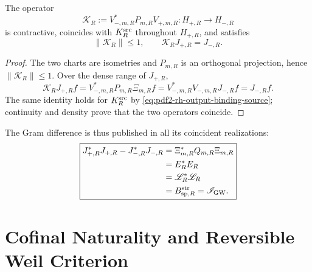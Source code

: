 \begin{proposition}
\label{prop:pdf2-rh-conector}
The operator
\begin{equation}\label{eq:pdf2-rh-k-r}
 \mathcal K_R
 :=V_{-,m,R}^*P_{m,R}V_{+,m,R}:
 H_{+,R}\longrightarrow H_{-,R}
\end{equation}
is contractive, coincides with \(\mathcal K_R^{\rm src}\) throughout
\(H_{+,R}\), and satisfies
\begin{equation}\label{eq:pdf2-rh-k-binding}
 \|\mathcal K_R\|\leq1,
 \qquad
 \mathcal K_RJ_{+,R}=J_{-,R}.
\end{equation}
\end{proposition}

\begin{proof}
The two charts are isometries and \(P_{m,R}\) is an orthogonal projection,
hence \(\|\mathcal K_R\|\leq1\). Over the dense range of \(J_{+,R}\),
\[
 \mathcal K_RJ_{+,R}f
 =V_{-,m,R}^*P_{m,R}\Xi_{m,R}f
 =V_{-,m,R}^*V_{-,m,R}J_{-,R}f
 =J_{-,R}f.
\]
The same identity holds for \(\mathcal K_R^{\rm src}\) by
\eqref{eq:pdf2-rh-output-binding-source}; continuity and density
prove that the two operators coincide.
\end{proof}

The Gram difference is thus published in all its coincident realizations:
\begin{equation}\label{eq:pdf2-rh-tres-publicaciones}
\boxed{
\begin{aligned}
 J_{+,R}^*J_{+,R}-J_{-,R}^*J_{-,R}
 &=\Xi_{m,R}^*Q_{m,R}\Xi_{m,R}\\
 &=E_R^*E_R\\
 &=\mathscr L_R^*\mathscr L_R\\
 &=\mathcal B_{{\rm sp},R}^{\rm str}=\mathscr I_{\rm GW}.
\end{aligned}}
\end{equation}

\section{Cofinal Naturality and Reversible Weil Criterion}

